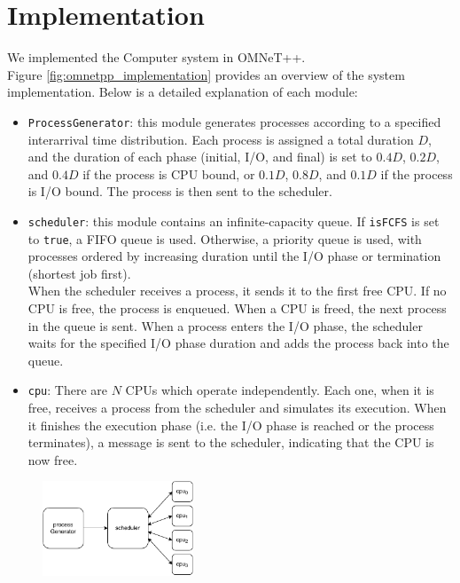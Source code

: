 \chapter{Implementation}
We implemented the Computer system in OMNeT++.\\
Figure \autoref{fig:omnetpp_implementation} provides an overview of the system implementation. Below is a detailed explanation of each module:
\begin{itemize}
    \item \texttt{ProcessGenerator}: this module generates processes according to a specified interarrival time distribution. Each process is assigned a total duration $D$, and the duration of each phase (initial, I/O, and final) is set to $0.4 D$, $0.2 D$, and $0.4 D$ if the process is CPU bound, or $0.1 D$, $0.8 D$, and $0.1 D$ if the process is I/O bound. The process is then sent to the scheduler.
    \item \texttt{scheduler}: this module contains an infinite-capacity queue. If \texttt{isFCFS} is set to \texttt{true}, a FIFO queue is used. Otherwise, a priority queue is used, with processes ordered by increasing duration until the I/O phase or termination (shortest job first).\\
    When the scheduler receives a process, it sends it to the first free CPU. If no CPU is free, the process is enqueued. When a CPU is freed, the next process in the queue is sent.
    When a process enters the I/O phase, the scheduler waits for the specified I/O phase duration and adds the process back into the queue.
    \item \texttt{cpu}: There are $N$ CPUs which operate independently. Each one, when it is free, receives a process from the scheduler and simulates its execution. When it finishes the execution phase (i.e. the I/O phase is reached or the process terminates), a message is sent to the scheduler, indicating that the CPU is now free.
\end{itemize}

\begin{figure}[H]
    \captionsetup{type=figure}
    \centering
    \includegraphics[width=0.4\textwidth]{images/example/Computer.pdf}
    \label{fig:omnetpp_implementation}
\end{figure}
